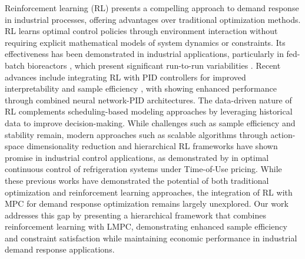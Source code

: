 Reinforcement learning (RL) presents a compelling approach to demand response in industrial processes, offering advantages over traditional optimization methods. RL learns optimal control policies through environment interaction without requiring explicit mathematical models of system dynamics or constraints. Its effectiveness has been demonstrated in industrial applications, particularly in fed-batch bioreactors \citep{kaisare2003simulation, peroni2005optimal}, which present significant run-to-run variabilities \citep{YOO2021108, PETSAGKOURAKIS202235}. Recent advances include integrating RL with PID controllers for improved interpretability and sample efficiency \citep{lawrence2022deep}, with \cite{CIRL} showing enhanced performance through combined neural network-PID architectures. The data-driven nature of RL complements scheduling-based modeling approaches by leveraging historical data to improve decision-making. While challenges such as sample efficiency and stability remain, modern approaches such as scalable algorithms through action-space dimensionality reduction \citep{zhu2020scalable} and hierarchical RL frameworks have shown promise in industrial control applications, as demonstrated by \cite{kim_optimal_2023} in optimal continuous control of refrigeration systems under Time-of-Use pricing. While these previous works have demonstrated the potential of both traditional optimization and reinforcement learning approaches, the integration of RL with MPC for demand response optimization remains largely unexplored. Our work addresses this gap by presenting a hierarchical framework that combines reinforcement learning with LMPC, demonstrating enhanced sample efficiency and constraint satisfaction while maintaining economic performance in industrial demand response applications.